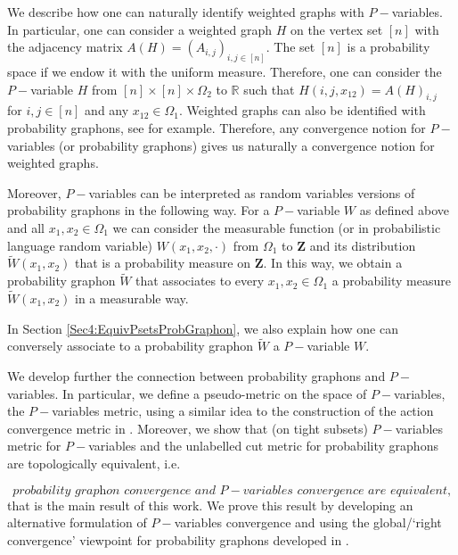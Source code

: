 \documentclass[11pt]{article}
\def\R{\mathbb{R}}
\newcommand{\Space}{\mathbf{Z}}
\begin{document}
We describe how one can naturally identify weighted graphs with $P-$variables. In particular, one can consider a weighted graph $H$ on the vertex set $[n]$ with the adjacency matrix $A(H)=(A_{i,j})_{i,j\in [n]}.$ The set $[n]$ is a probability space if we endow it with the uniform measure. Therefore, one can consider the $P-$variable $H$ from $[n]\times [n]\times \Omega_2$ to $\R$ such that $H(i,j,x_{12})=A(H)_{i,j}$ for $i,j\in [n]$ and any $x_{12}\in \Omega_1.$ Weighted graphs can also be identified with probability graphons, see \cite{abraham2023probabilitygraphons, zucal2024probabilitygraphonsrightconvergence} for example. Therefore, any convergence notion for $P-$variables (or probability graphons) gives us naturally a convergence notion for weighted graphs.

Moreover, $P-$variables can be interpreted as random variables versions of probability graphons in the following way. For a $P-$variable $W$ as defined above and all $x_1,x_2\in \Omega_1$ we can consider the measurable function (or in probabilistic language random variable) $W(x_1,x_2,\cdot)$ from $\Omega_1$ to $\Space$ and its distribution $\widetilde W(x_1,x_2)$ that is a probability measure on $\Space$. In this way, we obtain a probability graphon $\widetilde W$ that associates to every $x_1,x_2\in \Omega_1$ a probability measure $\widetilde W(x_1,x_2)$ in a measurable way.

In Section \ref{Sec4:EquivPsetsProbGraphon}, we also explain how one can conversely associate to a probability graphon $\widetilde{W}$ a $P-$variable $W.$

 
We develop further the connection between probability graphons and $P-$variables. In particular, we define a pseudo-metric on the space of $P-$variables, the $P-$variables metric, using a similar idea to the construction of the action convergence metric in \cite{backhausz2018action}. Moreover, we show that (on tight subsets) $P-$variables metric for $P-$variables and the unlabelled cut metric for probability graphons are topologically equivalent, i.e.\

$$
\textit{probability graphon convergence and $P-$variables convergence are equivalent,}
$$
that is the main result of this work. We prove this result by developing an alternative formulation of $P-$variables convergence and using the global/`right convergence' viewpoint for probability graphons developed in \cite{zucal2024probabilitygraphonsrightconvergence}.
\end{document}
